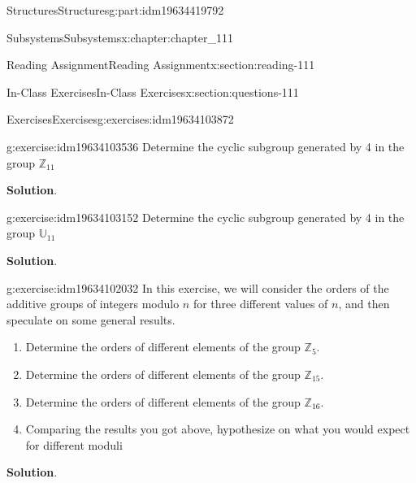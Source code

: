 \documentclass[oneside,10pt,]{book}
\newcommand{\blocktitlefont}{\relax}
\numberwithin{equation}{section}
\begin{document}
\begin{partptx}{Structures}{}{Structures}{}{}{g:part:idm19634419792}
\begin{chapterptx}{Subsystems}{}{Subsystems}{}{}{x:chapter:chapter_111}
\begin{sectionptx}{Reading Assignment}{}{Reading Assignment}{}{}{x:section:reading-111}
\end{sectionptx}
%
%
\typeout{************************************************}
\typeout{************************************************}
%
\begin{sectionptx}{In-Class Exercises}{}{In-Class Exercises}{}{}{x:section:questions-111}
%
%
%
\typeout{************************************************}
\typeout{************************************************}
%
\begin{exercises-subsection-numberless}{Exercises}{}{Exercises}{}{}{g:exercises:idm19634103872}
\par\medskip\noindent%
%
\begin{exercisegroup}
\begin{divisionexerciseeg}{1}{}{}{g:exercise:idm19634103536}%
Determine the cyclic subgroup generated by 4 in the group \(\mathbb{Z}_{11}\)%
\par\smallskip%
\noindent\textbf{\blocktitlefont Solution}.\hypertarget{g:solution:idm19634103408}{}\quad{}%
\end{divisionexerciseeg}%
\begin{divisionexerciseeg}{2}{}{}{g:exercise:idm19634103152}%
Determine the cyclic subgroup generated by 4 in the group \(\mathbb{U}_{11}\)%
\par\smallskip%
\noindent\textbf{\blocktitlefont Solution}.\hypertarget{g:solution:idm19634102288}{}\quad{}%
\end{divisionexerciseeg}%
\begin{divisionexerciseeg}{3}{}{}{g:exercise:idm19634102032}%
In this exercise, we will consider the orders of the additive groups of integers modulo \(n\) for three different values of \(n\), and then speculate on some general results.%
\begin{enumerate}[label=(\alph*)]
\item{}Determine the orders of different elements of the group \(\mathbb{Z}_{5}\).%
\item{}Determine the orders of different elements of the group \(\mathbb{Z}_{15}\).%
\item{}Determine the orders of different elements of the group \(\mathbb{Z}_{16}\).%
\item{}Comparing the results you got above, hypothesize on what you would expect for different moduli%
\end{enumerate}
%
\par\smallskip%
\noindent\textbf{\blocktitlefont Solution}.\hypertarget{g:solution:idm19634101168}{}\quad{}%

\end{divisionexerciseeg}
\end{exercisegroup}
\end{exercises-subsection-numberless}
\end{sectionptx}
\end{chapterptx}
\end{partptx}
\end{document}
